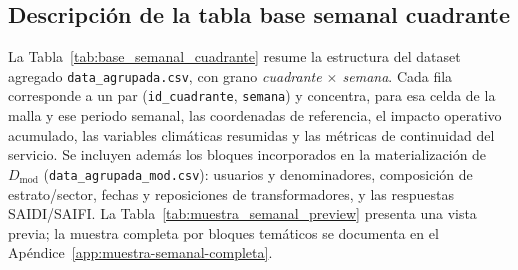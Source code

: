 \subsection{Descripción de la tabla base semanal cuadrante}
    La Tabla~\ref{tab:base_semanal_cuadrante} resume la estructura del dataset agregado \texttt{data\_agrupada.csv}, con grano \textit{cuadrante $\times$ semana}. Cada fila corresponde a un par (\texttt{id\_cuadrante}, \texttt{semana}) y concentra, para esa celda de la malla y ese periodo semanal, las coordenadas de referencia, el impacto operativo acumulado, las variables climáticas resumidas y las métricas de continuidad del servicio. Se incluyen además los bloques incorporados en la materialización de $D_{\mathrm{mod}}$ (\texttt{data\_agrupada\_mod.csv}): usuarios y denominadores, composición de estrato/sector, fechas y reposiciones de transformadores, y las respuestas SAIDI/SAIFI. La Tabla~\ref{tab:muestra_semanal_preview} presenta una vista previa; la muestra completa por bloques temáticos se documenta en el Apéndice~\ref{app:muestra-semanal-completa}.
    
